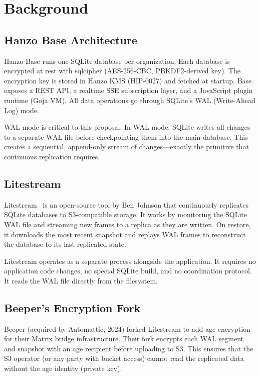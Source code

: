 \documentclass[11pt]{article}
\begin{document}
\section{Background}

\subsection{Hanzo Base Architecture}

Hanzo Base runs one SQLite database per organization. Each database is
encrypted at rest with sqlcipher (AES-256-CBC, PBKDF2-derived key). The
encryption key is stored in Hanzo KMS (HIP-0027) and fetched at startup.
Base exposes a REST API, a realtime SSE subscription layer, and a JavaScript
plugin runtime (Goja VM). All data operations go through SQLite's WAL
(Write-Ahead Log) mode.

WAL mode is critical to this proposal. In WAL mode, SQLite writes all
changes to a separate WAL file before checkpointing them into the main
database. This creates a sequential, append-only stream of changes---exactly
the primitive that continuous replication requires.

\subsection{Litestream}

Litestream~\cite{litestream} is an open-source tool by Ben Johnson that
continuously replicates SQLite databases to S3-compatible storage. It works
by monitoring the SQLite WAL file and streaming new frames to a replica as
they are written. On restore, it downloads the most recent snapshot and
replays WAL frames to reconstruct the database to its last replicated state.

Litestream operates as a separate process alongside the application. It
requires no application code changes, no special SQLite build, and no
coordination protocol. It reads the WAL file directly from the filesystem.

\subsection{Beeper's Encryption Fork}

Beeper (acquired by Automattic, 2024) forked Litestream to add age
encryption for their Matrix bridge infrastructure. Their fork encrypts each
WAL segment and snapshot with an age recipient before uploading to S3. This
ensures that the S3 operator (or any party with bucket access) cannot read
the replicated data without the age identity (private key).
\end{document}
